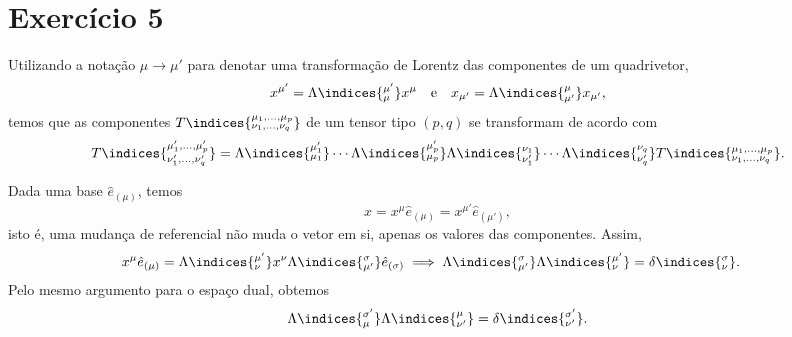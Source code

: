 \section*{Exercício 5}
Utilizando a notação \(\mu \to \mu'\) para denotar uma transformação de Lorentz das componentes de um quadrivetor,
\begin{equation*}
    x^{\mu'} = \Lambda\indices{^{\mu'}_\mu} x^\mu\quad\text{e}\quad x_{\mu'} = \Lambda\indices{^{\mu}_{\mu'}}x_{\mu'},
\end{equation*}
temos que as componentes \(T\indices{^{\mu_1,\dots,\mu_p}_{\nu_1,\dots,\nu_q}}\) de um tensor tipo \((p,q)\) se transformam de acordo com
\begin{equation*}
    T\indices{^{\mu'_1,\dots,\mu'_p}_{\nu'_1,\dots,\nu'_q}} = \Lambda\indices{^{\mu'_1}_{\mu_1}}\dotsm\Lambda\indices{^{\mu'_p}_{\mu_p}} \Lambda\indices{^{\nu_1}_{\nu'_1}}\dotsm\Lambda\indices{^{\nu_q}_{\nu'_q}} T\indices{^{\mu_1,\dots,\mu_p}_{\nu_1,\dots,\nu_q}}.
\end{equation*}

Dada uma base \(\hat{e}_{(\mu)}\), temos
\begin{equation*}
    x = x^\mu \hat{e}_{(\mu)} = x^{\mu'} \hat{e}_{(\mu')},
\end{equation*}
isto é, uma mudança de referencial não muda o vetor em si, apenas os valores das componentes. Assim,
\begin{align*}
    x^\mu \hat{e}_{(\mu)} &= \Lambda\indices{^{\mu'}_\nu} x^\nu \Lambda\indices{^\sigma_{\mu'}} \hat{e}_{(\sigma)} \implies \Lambda\indices{^\sigma_{\mu'}}\Lambda\indices{^{\mu'}_\nu}   = \delta\indices{^\sigma_\nu}.
\end{align*}
Pelo mesmo argumento para o espaço dual, obtemos
\begin{equation*}
    \Lambda\indices{^{\sigma'}_\mu}\Lambda\indices{^\mu_{\nu'}} = \delta\indices{^{\sigma'}_{\nu'}}.
\end{equation*}
